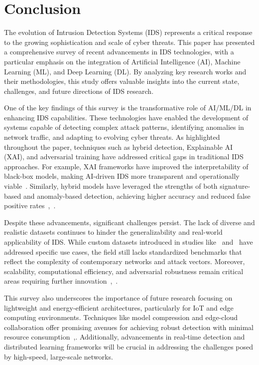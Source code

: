 \section{Conclusion}
\label{Conclusion}

The evolution of Intrusion Detection Systems (IDS) represents a critical response to the growing sophistication and scale of cyber threats. This paper has presented a comprehensive survey of recent advancements in IDS technologies, with a particular emphasis on the integration of Artificial Intelligence (AI), Machine Learning (ML), and Deep Learning (DL). By analyzing key research works and their methodologies, this study offers valuable insights into the current state, challenges, and future directions of IDS research.

One of the key findings of this survey is the transformative role of AI/ML/DL in enhancing IDS capabilities. These technologies have enabled the development of systems capable of detecting complex attack patterns, identifying anomalies in network traffic, and adapting to evolving cyber threats. As highlighted throughout the paper, techniques such as hybrid detection, Explainable AI (XAI), and adversarial training have addressed critical gaps in traditional IDS approaches. For example, XAI frameworks have improved the interpretability of black-box models, making AI-driven IDS more transparent and operationally viable~\cite{Islam2023}. Similarly, hybrid models have leveraged the strengths of both signature-based and anomaly-based detection, achieving higher accuracy and reduced false positive rates~\cite{Rele2023},~\cite{Mohammad2024}.

Despite these advancements, significant challenges persist. The lack of diverse and realistic datasets continues to hinder the generalizability and real-world applicability of IDS. While custom datasets introduced in studies like~\cite{Ghadermazi2024} and~\cite{aljuaid2024deep} have addressed specific use cases, the field still lacks standardized benchmarks that reflect the complexity of contemporary networks and attack vectors. Moreover, scalability, computational efficiency, and adversarial robustness remain critical areas requiring further innovation~\cite{Dandaras2023},~\cite{wang2023}.

This survey also underscores the importance of future research focusing on lightweight and energy-efficient architectures, particularly for IoT and edge computing environments. Techniques like model compression and edge-cloud collaboration offer promising avenues for achieving robust detection with minimal resource consumption~\cite{Gutierrez2023},\cite{Sowmya2023}. Additionally, advancements in real-time detection and distributed learning frameworks will be crucial in addressing the challenges posed by high-speed, large-scale networks\cite{Chen2024}.

